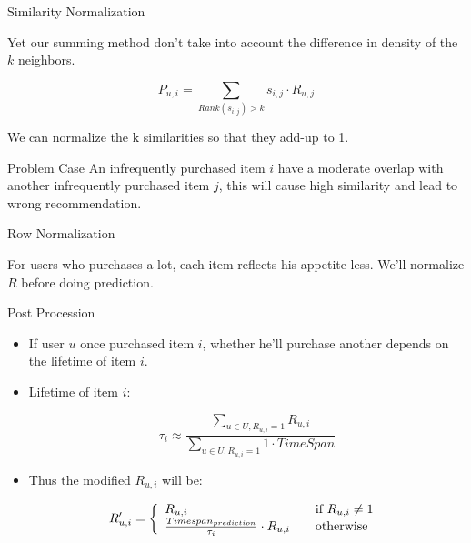 \documentclass{beamer}
\begin{document}
\begin{frame}{Similarity Normalization}

Yet our summing method don't take into account the difference in density of the $k$ neighbors.

\begin{equation}
P_{u,i} = \sum_{Rank(s_{i,j})>k} s_{i,j} \cdot R_{u,j}
\end{equation}

We can normalize the k similarities so that they add-up to 1.

\begin{exampleblock}{Problem Case}
An infrequently purchased item $i$ have a moderate overlap with another infrequently purchased item $j$, this will cause high similarity and lead to wrong recommendation.
\end{exampleblock}

\end{frame}


\begin{frame}{Row Normalization}

For users who purchases a lot, each item reflects his appetite less. We'll normalize $R$ before doing prediction.

\end{frame}


\begin{frame}{Post Procession}

\begin{itemize}
\item If user $u$ once purchased item $i$, whether he'll purchase another depends on the lifetime of item $i$.
\item Lifetime of item $i$:

    \begin{equation}
    \tau_i \approx \frac{\sum_{u \in U, R_{u,i}=1} R_{u,i}}{\sum_{u \in U, R_{u,i}=1}1 \cdot TimeSpan}
    \end{equation}

\item Thus the modified $R_{u,i}$ will be:

    \begin{equation}
        R'_{u,i} = \left\{ 
        \begin{array}{l l}
        R_{u,i} & \quad \text{if $R_{u,i} \neq 1$ }\\
        \frac{Timespan_{prediction}}{\tau_i} \cdot R_{u,i} & \quad \text{otherwise}
        \end{array} \right.
    \end{equation}

\end{itemize}

\end{frame}
\end{document}
